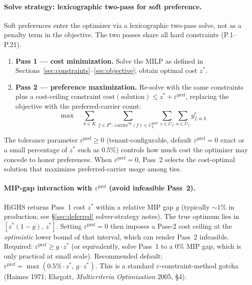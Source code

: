 \documentclass[11pt,a4paper]{article}
\theoremstyle{definition}
\begin{document}
\paragraph{Solve strategy: lexicographic two-pass for soft preference.}
Soft preferences enter the optimizer via a lexicographic two-pass solve, not as a
penalty term in the objective. The two passes share all hard constraints
(P.1--P.21).
\begin{enumerate}[noitemsep]
  \item \textbf{Pass 1 --- cost minimization.} Solve the MILP as defined in
        Sections~\ref{sec:constraints}--\ref{sec:objective}; obtain optimal cost $z^*$.
  \item \textbf{Pass 2 --- preference maximization.} Re-solve with the same
        constraints plus a cost-ceiling constraint
        $\text{cost}(\text{solution}) \leq z^* + \varepsilon^{\text{pref}}$, replacing
        the objective with the preferred-carrier count:
        \begin{equation}
          \max \quad \sum_{k \in K} \sum_{f \in F^k :\, \text{carrier}^{\text{op}}(f) \in C_k^{\text{pref}}}
                     \sum_{c \in C_f}\sum_{u \in U_f} y_{f,u,k}^c
          \label{eq:pass2-obj}
        \end{equation}
\end{enumerate}
The tolerance parameter $\varepsilon^{\text{pref}} \geq 0$ (tenant-configurable,
default $\varepsilon^{\text{pref}} = 0$ exact or a small percentage of $z^*$ such as
$0.5\%$) controls how much cost the optimizer may concede to honor preferences.
When $\varepsilon^{\text{pref}} = 0$, Pass~2 selects the cost-optimal solution that
maximizes preferred-carrier usage among ties.

\paragraph{MIP-gap interaction with $\varepsilon^{\text{pref}}$ (avoid infeasible Pass~2).}
HiGHS returns Pass~1 cost $z^*$ within a relative MIP gap $g$ (typically
$\sim 1\%$ in production; see \S\ref{sec:deferred} solver-strategy notes). The true
optimum lies in $[z^*(1 - g),\, z^*]$. Setting $\varepsilon^{\text{pref}} = 0$ then
imposes a Pass-2 cost ceiling at the \emph{optimistic} lower bound of that interval,
which can render Pass~2 infeasible. Required: $\varepsilon^{\text{pref}} \geq g \cdot z^*$
(or equivalently, solve Pass~1 to a 0\% MIP gap, which is only practical at small
scale). Recommended default: $\varepsilon^{\text{pref}} = \max(0.5\% \cdot z^*,\,
g \cdot z^*)$. This is a standard $\varepsilon$-constraint-method gotcha (Haimes 1971;
Ehrgott, \emph{Multicriteria Optimization} 2005, \S4).
\end{document}
